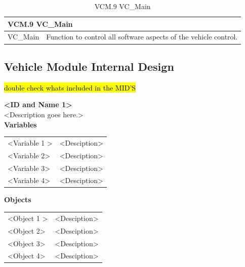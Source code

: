 \documentclass [10pt]{article}
\begin{document}
\begin{longtable}{| p{ } | p{ } | }\caption{VCM.9 VC\_Main} \\\hline  
 \multicolumn{2}{|l|}{\textbf {VCM.9 VC\_Main}}\\ \hline
\cellcolor{tableCell}VC\_Main& \cellcolor{tableCell}Function to control all software aspects of the vehicle control.  \\ \hline 

\end{longtable}






\subsection{Vehicle Module Internal Design}

\begin{center}
    \hl {double check whats included in the MID'S}
\end{center}


\textbf{<ID and Name 1>} \\

<Description goes here.>  \\

\textbf{Variables} 

\begin{longtable}{ p{ }  p{ }} \\ 

 
\rowcolor{tableCell} <Variable 1 >& <Desciption> \\ 
<Variable 2>& <Desciption> \\

\rowcolor{tableCell}<Variable 3> & <Desciption> \\ 
<Variable 4>& <Desciption> \\

\end{longtable}

\textbf{Objects} 
\begin{longtable}{ p{ }  p{ }} \\ 

 
\rowcolor{tableCell} <Object 1 >& <Desciption> \\ 
<Object 2>& <Desciption> \\

\rowcolor{tableCell}<Object 3> & <Desciption> \\ 
<Object 4>& <Desciption> \\

\end{longtable}
\end{document}
